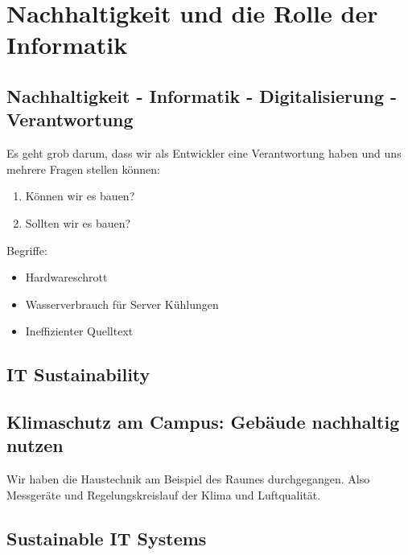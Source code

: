 \documentclass[a4paper]{article}
\title{\docTitle}
\author{Moritz}
\date{\today}
\begin{document}
\maketitle
\tableofcontents


\section{Nachhaltigkeit und die Rolle der Informatik}

\subsection{Nachhaltigkeit - Informatik - Digitalisierung - Verantwortung}


Es geht grob darum, dass wir als Entwickler eine Verantwortung haben und uns mehrere Fragen stellen können:

\begin{enumerate}
    \item Können wir es bauen?
    \item Sollten wir es bauen?
\end{enumerate}

Begriffe:

\begin{itemize}
    \item Hardwareschrott
    \item Wasserverbrauch für Server Kühlungen
    \item Ineffizienter Quelltext
\end{itemize}

\subsection{IT Sustainability}


\subsection{Klimaschutz am Campus: Gebäude nachhaltig nutzen}

Wir haben die Haustechnik am Beispiel des Raumes durchgegangen. Also Messgeräte und Regelungskreislauf der Klima und Luftqualität.

\subsection{Sustainable IT Systems}
\end{document}
